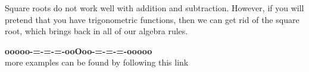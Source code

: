 \documentclass{ximera}
\begin{document}
Square roots do not work well with addition and subtraction.  However, if you will pretend that you have trigonometric functions, then we can get rid of the square root, which brings back in all of our algebra rules.



























\begin{center}
\textbf{\textcolor{green!50!black}{ooooo-=-=-=-ooOoo-=-=-=-ooooo}} \\

more examples can be found by following this link\\ 

\end{center}
\end{document}
